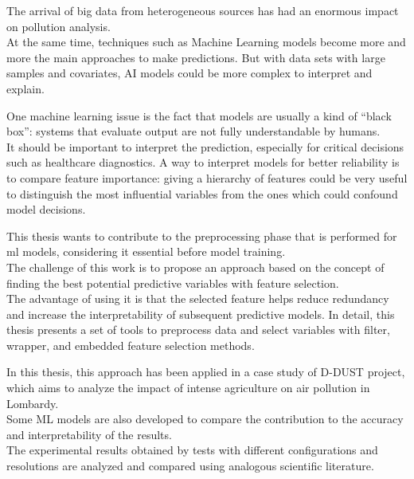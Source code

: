 The arrival of big data from heterogeneous sources has had an enormous impact on pollution analysis.\\
At the same time, techniques such as Machine Learning models become more and more the main approaches to make predictions. But with data sets with large samples and covariates, AI models could be more complex to interpret and explain.\par
One machine learning issue is the fact that models are usually a kind of “black box”: systems that evaluate output are not fully understandable by humans. \\
It should be important to interpret the prediction, especially for critical decisions such as healthcare diagnostics.
A way to interpret models for better reliability is to compare feature importance: giving a hierarchy of features could be very useful to distinguish the most influential variables from the ones which could confound model decisions.\par
This thesis wants to contribute to the preprocessing phase that is performed for \gls{ml} models, considering it essential before model training.\\
The challenge of this work is to propose an approach based on the concept of finding the best potential predictive variables with feature selection.\\
The advantage of using it is that the selected feature helps reduce redundancy and increase the interpretability of subsequent predictive models.
In detail, this thesis presents a set of tools to preprocess data and select variables with filter, wrapper, and embedded feature selection methods.\par
In this thesis, this approach has been applied in a case study of D-DUST project, which aims to analyze the impact of intense agriculture on air pollution in Lombardy.\\
Some ML models are also developed to compare the contribution to the accuracy and interpretability of the results.\\
The experimental results obtained by tests with different configurations and resolutions are analyzed and compared using analogous scientific literature.
\\
\\